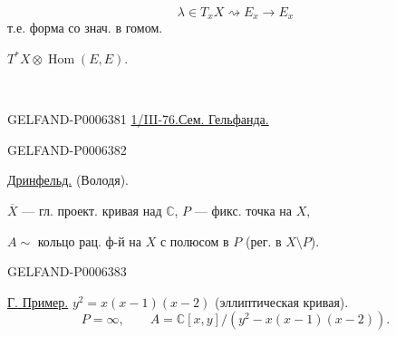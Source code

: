\par\noindent\begin{minipage}{\linewidth}
\[
\lambda\in T_xX\rightsquigarrow E_x\to E_x
\]
т.е. форма со знач. в гомом.

\underline{\(T^*X\otimes\operatorname{Hom}(E,E)\)}.

\begin{center}\textemdash\,\textperiodcentered\,\textemdash\end{center}
\end{minipage}\par


\begin{GelfandAdjacentEvidence}{GELFAND-P000638}{1}
\underline{1/III-76.}\quad \underline{Сем. Гельфанда.}
\end{GelfandAdjacentEvidence}
\begin{GelfandAdjacentEvidence}{GELFAND-P000638}{2}


\underline{Дринфельд.} (Володя).

\(\overline X\) --- гл. проект. кривая над \(\mathbb C\),
\(P\) --- фикс. точка на \(X\),

\(A\sim\) кольцо рац. ф-й на \(X\) с полюсом в \(P\)
(рег. в \(X\setminus P\)).
\end{GelfandAdjacentEvidence}
\begin{GelfandAdjacentEvidence}{GELFAND-P000638}{3}


\underline{Г. Пример.} \(y^2=x(x-1)(x-2)\) (эллиптическая кривая).
\[
P=\infty,\qquad A=\mathbb C[x,y]/(y^2-x(x-1)(x-2)).
\]
\end{GelfandAdjacentEvidence}
